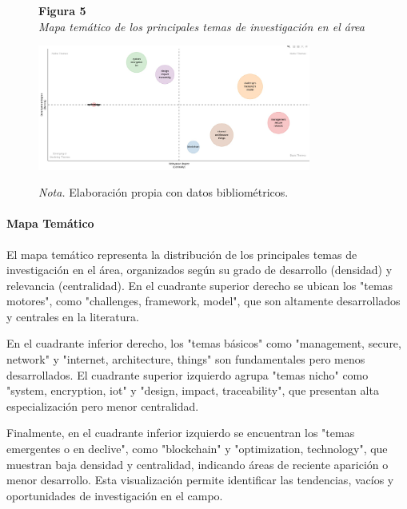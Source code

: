 \begin{figure}[htbp]
    \begin{flushleft}
        \textbf{Figura 5}\\[2em]
        \textit{Mapa temático de los principales temas de investigación en el área}
    \end{flushleft}
    \vspace{1em}
    \centering
    \includegraphics[width=0.8\textwidth]{Images/MapaTematico.jpeg}
    \vspace{2em}
    \begin{flushleft}
        \textit{Nota.} Elaboración propia con datos bibliométricos.
    \end{flushleft}
    \label{fig:mapa_tematico}
\end{figure}

\paragraph{Mapa Temático}
El mapa temático representa la distribución de los principales temas de investigación en el área, organizados según su grado de desarrollo (densidad) y relevancia (centralidad). En el cuadrante superior derecho se ubican los "temas motores", como "challenges, framework, model", que son altamente desarrollados y centrales en la literatura.

En el cuadrante inferior derecho, los "temas básicos" como "management, secure, network" y "internet, architecture, things" son fundamentales pero menos desarrollados. El cuadrante superior izquierdo agrupa "temas nicho" como "system, encryption, iot" y "design, impact, traceability", que presentan alta especialización pero menor centralidad.

Finalmente, en el cuadrante inferior izquierdo se encuentran los "temas emergentes o en declive", como "blockchain" y "optimization, technology", que muestran baja densidad y centralidad, indicando áreas de reciente aparición o menor desarrollo. Esta visualización permite identificar las tendencias, vacíos y oportunidades de investigación en el campo.

